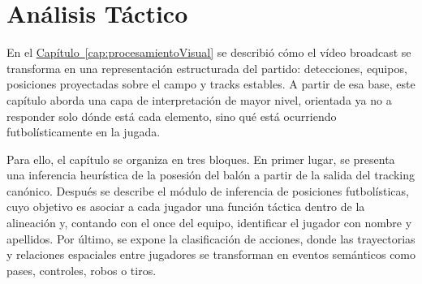 \chapter{Análisis Táctico}
\label{cap:analisisTactico}

En el \hyperref[cap:procesamientoVisual]{Capítulo~\ref*{cap:procesamientoVisual}} se describió cómo el vídeo broadcast se transforma en una representación estructurada del partido: detecciones, equipos, posiciones proyectadas sobre el campo y tracks estables. A partir de esa base, este capítulo aborda una capa de interpretación de mayor nivel, orientada ya no a responder solo dónde está cada elemento, sino qué está ocurriendo futbolísticamente en la jugada.

Para ello, el capítulo se organiza en tres bloques. En primer lugar, se presenta una inferencia heurística de la posesión del balón a partir de la salida del tracking canónico. Después se describe el módulo de inferencia de posiciones futbolísticas, cuyo objetivo es asociar a cada jugador una función táctica dentro de la alineación y, contando con el once del equipo, identificar el jugador con nombre y apellidos. Por último, se expone la clasificación de acciones, donde las trayectorias y relaciones espaciales entre jugadores se transforman en eventos semánticos como pases, controles, robos o tiros.




